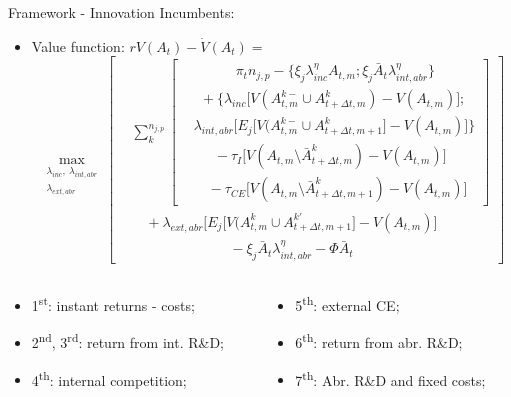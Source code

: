 \documentclass[11pt]{beamer}
\begin{document}
\begin{frame}{Framework - Innovation}
Incumbents:
	\begin{itemize}
	\item Value function: $rV(A_t) - \dot{V}(A_t) =$\vspace{-3mm} $$ \max_{\substack{\lambda_{inc},\:\lambda_{int, abr}\\\lambda_{ext, abr}}}\left[\begin{aligned}
		&\sum_k^{n_{j, p}}\left[\begin{aligned}
			&\qquad\quad\pi_t n_{j, p} - \{\xi_j\lambda_{inc}^{\eta}A_{t,m};\xi_j\bar{A}_t\lambda_{int, abr}^{\eta}\}\\
			&\ \ + \{\lambda_{inc}\big[V(A_{t,m}^{k-}\cup A_{t+\Delta t,m}^{k}) - V(A_{t,m})\big];\\
			& \lambda_{int, abr}\big[E_j\big[V(A_{t,m}^{k-}\cup A_{t+\Delta t,m+1}^{k}\big] - V(A_{t,m})\big]\}\\
			&\quad\ \ - \tau_I\big[V(A_{t,m}\setminus \bar{A}_{t+\Delta t,m}^{k}) - V(A_{t,m})\big]\\
			&\quad- \tau_{CE}\big[V(A_{t,m}\setminus\bar{A}_{t+\Delta t,m+1}^{k}) - V(A_{t,m})\big]
		\end{aligned}\right]\\
		&\quad+ \lambda_{ext, abr}\big[E_j\big[V(A_{t,m}^{k}\cup A_{t+\Delta t,m+1}^{k'}\big] - V(A_{t,m})\big]\\
		&\qquad\qquad\qquad\quad- \xi_j\bar{A}_t\lambda_{int, abr}^{\eta} - \Phi\bar{A}_t
	\end{aligned}\right]$$
	\end{itemize}
	\vspace{-3mm}
	\begin{columns}
	\begin{column}{0.5\textwidth}
	\begin{itemize}\itemsep3pt	
   	\item 1\textsuperscript{st}: instant returns - costs;
	\item 2\textsuperscript{nd}, 3\textsuperscript{rd}: return from int. R\&D;
	\item 4\textsuperscript{th}: internal competition;
	\end{itemize}
	\end{column}
	\begin{column}{0.5\textwidth}
	\begin{itemize}\itemsep3pt	
	\item 5\textsuperscript{th}: external CE;
	\item 6\textsuperscript{th}: return from abr. R\&D;
	\item 7\textsuperscript{th}: Abr. R\&D and fixed costs;
	\end{itemize}    
	\end{column}
	\end{columns}			
\end{frame}
\end{document}
